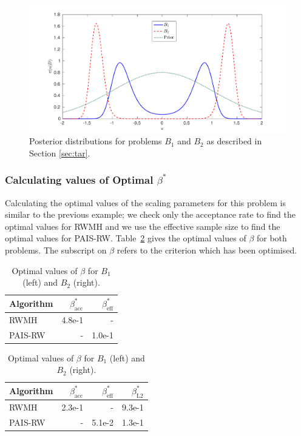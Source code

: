 \documentclass[final]{siamltex}
\begin{document}
\begin{figure}[htpb]
\begin{center}
\includegraphics[width=\textwidth]{"figures/posteriors3"}
\caption{Posterior distributions for problems $B_1$ and $B_2$ as
  described in Section \ref{sec:tar}.}
\label{fig:problem 3 posteriors}
\end{center}
\end{figure}

\subsubsection{Calculating values of Optimal $\beta^*$}\label{sec:BM1_opt_beta}

Calculating the optimal values of the scaling parameters for this
problem is similar to the previous example; we check only the acceptance
rate to find the optimal values for RWMH and we use the effective
sample size to find the optimal values for PAIS-RW.
Table~\ref{table:BM_opt_beta} gives the optimal values of $\beta$ for both
problems. The subscript on $\beta$ refers to the criterion which has been optimised.

\begin{table}[!htb]
    \begin{minipage}{.5\linewidth}
      \centering
        \begin{tabular}{|l|r|r|}
	\hline
	Algorithm							& $\beta^*_{\text{acc}}$	& $\beta^*_{\text{eff}}$ \\ \hline
	RWMH								& 4.8e-1					& - \\
	PAIS-RW								& -						& 1.0e-1\\
	\hline
	\end{tabular}
    \end{minipage}%
    \begin{minipage}{.5\linewidth}
      \centering
        \begin{tabular}{|l|r|r|r|}
	\hline
	Algorithm							& $\beta^*_{\text{acc}}$	& $\beta^*_{\text{eff}}$	& $\beta^*_{\text{L2}}$ \\ \hline
	RWMH								& 2.3e-1					& - 						& 9.3e-1\\
	PAIS-RW								& -						& 5.1e-2 					& 1.3e-1\\
	\hline
	\end{tabular}
    \end{minipage}
	\vspace{1mm}
	\caption{Optimal values of $\beta$ for $B_1$ (left) and $B_2$ (right).}
	\label{table:BM_opt_beta}
\end{table}
\end{document}

